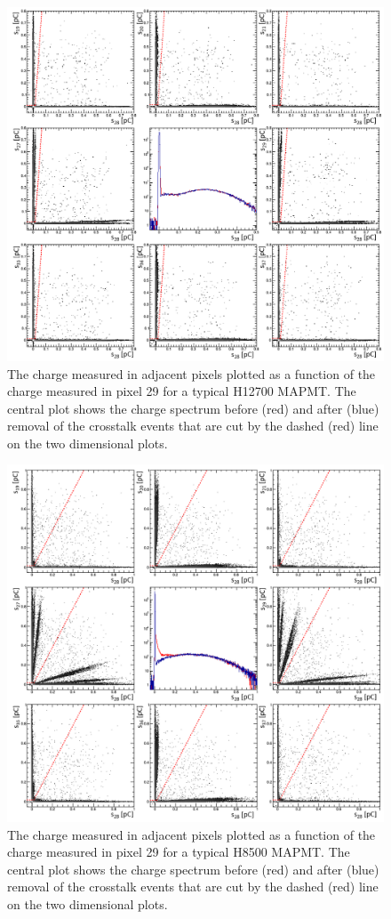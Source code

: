 \begin{figure}[h!bt]
	\centering
	\includegraphics[width=0.9\linewidth]{figures/H12700_ct.png}
	\caption{The charge measured in adjacent pixels plotted as a function of the charge measured in pixel 29 for a typical H12700 MAPMT. The central plot shows the charge spectrum before (red) and after (blue) removal of the crosstalk events that are cut by the dashed (red) line on the two dimensional plots.}
	\label{fig:H12700neighbors}
\end{figure}
\begin{figure}[h!bt]
    \centering
	\includegraphics[width=0.9\linewidth]{figures/H8500_ct.png}
	\caption{The charge measured in adjacent pixels plotted as a function of the charge measured in pixel 29 for a typical H8500 MAPMT. The central plot shows the charge spectrum before (red) and after (blue) removal of the crosstalk events that are cut by the dashed (red) line on the two dimensional plots.}
	\label{fig:H8500neighbors}
\end{figure}

